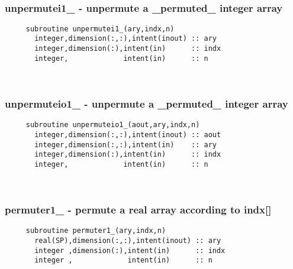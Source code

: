  
\mbox{}\hrulefill\ 

  \subsubsection{unpermutei1\_ - unpermute a \_permuted\_ integer array}

\begin{verbatim} 
     subroutine unpermutei1_(ary,indx,n)
       integer,dimension(:,:),intent(inout) :: ary
       integer,dimension(:),intent(in)      :: indx
       integer,             intent(in)      :: n
 \end{verbatim}%
 
 
\mbox{}\hrulefill\ 

  \subsubsection{unpermuteio1\_ - unpermute a \_permuted\_ integer array}

\begin{verbatim} 
     subroutine unpermuteio1_(aout,ary,indx,n)
       integer,dimension(:,:),intent(inout) :: aout
       integer,dimension(:,:),intent(in)    :: ary
       integer,dimension(:),intent(in)      :: indx
       integer,             intent(in)      :: n
 \end{verbatim}%
 
 
\mbox{}\hrulefill\ 
 
  \subsubsection{permuter1\_ - permute a real array according to indx[]}

\begin{verbatim} 
     subroutine permuter1_(ary,indx,n)
       real(SP),dimension(:,:),intent(inout) :: ary
       integer ,dimension(:),intent(in)      :: indx
       integer ,             intent(in)      :: n
 \end{verbatim}%
 
